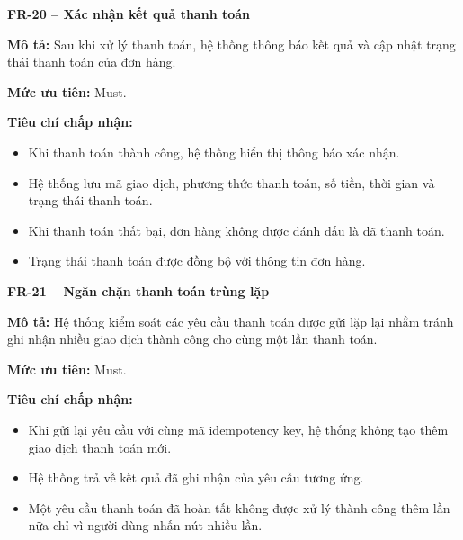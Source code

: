 \documentclass[a4paper]{article}
\begin{document}
\noindent\textbf{FR-20 – Xác nhận kết quả thanh toán}\par\nopagebreak
\begin{list}{}{%
    \setlength{\leftmargin}{0.8cm}%
    \setlength{\rightmargin}{0pt}%
    \setlength{\labelwidth}{0pt}%
    \setlength{\labelsep}{0pt}%
    \setlength{\itemindent}{0pt}%
    \setlength{\listparindent}{0pt}%
    \setlength{\itemsep}{5pt}%
    \setlength{\parsep}{0pt}%
    \setlength{\topsep}{5pt}%
}
\item[] \textbf{Mô tả:} Sau khi xử lý thanh toán, hệ thống thông báo kết quả và cập nhật trạng thái thanh toán của đơn hàng.
\item[] \textbf{Mức ưu tiên:} Must.
\item[] \textbf{Tiêu chí chấp nhận:} 
\begin{itemize}
\item Khi thanh toán thành công, hệ thống hiển thị thông báo xác nhận.
\item Hệ thống lưu mã giao dịch, phương thức thanh toán, số tiền, thời gian và trạng thái thanh toán.
\item Khi thanh toán thất bại, đơn hàng không được đánh dấu là đã thanh toán.
\item Trạng thái thanh toán được đồng bộ với thông tin đơn hàng.
\end{itemize}
\end{list}

\par\ifdim\dimexpr\pagegoal-\pagetotal\relax<6\baselineskip\newpage\fi
{}

\noindent\textbf{FR-21 – Ngăn chặn thanh toán trùng lặp}\par\nopagebreak
\begin{list}{}{%
    \setlength{\leftmargin}{0.8cm}%
    \setlength{\rightmargin}{0pt}%
    \setlength{\labelwidth}{0pt}%
    \setlength{\labelsep}{0pt}%
    \setlength{\itemindent}{0pt}%
    \setlength{\listparindent}{0pt}%
    \setlength{\itemsep}{5pt}%
    \setlength{\parsep}{0pt}%
    \setlength{\topsep}{5pt}%
}
\item[] \textbf{Mô tả:} Hệ thống kiểm soát các yêu cầu thanh toán được gửi lặp lại nhằm tránh ghi nhận nhiều giao dịch thành công cho cùng một lần thanh toán.
\item[] \textbf{Mức ưu tiên:} Must.
\item[] \textbf{Tiêu chí chấp nhận:} 
\begin{itemize}
\item Khi gửi lại yêu cầu với cùng mã idempotency key, hệ thống không tạo thêm giao dịch thanh toán mới.
\item Hệ thống trả về kết quả đã ghi nhận của yêu cầu tương ứng.
\item Một yêu cầu thanh toán đã hoàn tất không được xử lý thành công thêm lần nữa chỉ vì người dùng nhấn nút nhiều lần.
\end{itemize}
\end{list}
\end{document}
